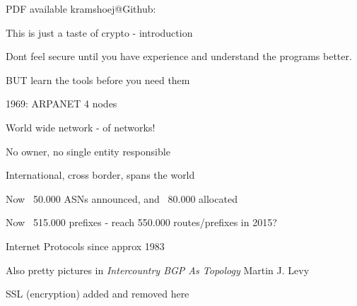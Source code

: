 \documentclass[20pt,landscape,a4paper,footrule]{foils}
\begin{document}

\centerline{\footnotesize PDF available kramshoej@Github: \jobname}






\begin{center}
This is just a taste of crypto - introduction

Dont feel secure until you have experience and understand the programs better.

BUT learn the tools before you need them
\end{center}




\centerline{1969: ARPANET 4 nodes}

\begin{list1}
\item World wide network - of networks!
\item No owner, no single entity responsible
\item International, cross border, spans the world
\item Now ~50.000 ASNs announced, and ~80.000 allocated
\item Now ~515.000 prefixes - reach 550.000 routes/prefixes in 2015?
\end{list1}


\vskip 1cm
\centerline{Internet Protocols since approx 1983}



Also pretty pictures in \emph{Intercountry BGP As Topology} Martin J. Levy\\



\centerline{SSL (encryption) added and removed here}



\end{document}
